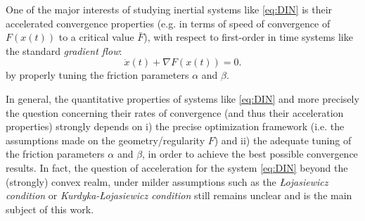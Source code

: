 \documentclass[reqno]{amsart}
\theoremstyle{plain}
\theoremstyle{definition}
\theoremstyle{remark}
\begin{document}
One of the major interests of studying inertial systems like \eqref{eq:DIN} is their accelerated convergence properties (e.g. in terms of speed of convergence of $F(x(t))$ to a critical value $\bar{F}$), with respect to first-order in time systems like the standard \textit{gradient flow}: 
\begin{equation}\label{GF}\tag{GF}
	\dot{x}(t) + \nabla F(x(t))=0.
\end{equation}
by properly tuning the friction parameters $\alpha$ and $\beta$.





In general, the quantitative properties of systems like \eqref{eq:DIN} and more precisely the question concerning their rates of convergence  (and thus their acceleration properties) strongly depends on i) the precise optimization framework (i.e. the assumptions made on the geometry/regularity $F$) and ii) the adequate tuning of the friction parameters $\alpha$ and $\beta$, in order to achieve the best possible convergence results.  In fact, the question of acceleration for the system \eqref{eq:DIN} beyond the (strongly) convex realm, under milder assumptions such as the \emph{\L ojasiewicz condition} or \emph{Kurdyka-\L ojasiewicz condition} \cite{polyak1963gradient,Loja63,Kurdyka1998} still remains unclear and is the main subject of this work. 
\end{document}
